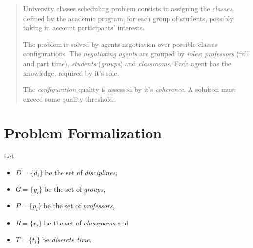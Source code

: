 \documentclass{article}
\newcommand{\red}[1]{{\color{red} #1}}
\begin{document}



\begin{abstract}
  
University classes scheduling problem consists in assigning
the \emph{classes}, defined by the academic program, for
each group of students, possibly taking in account participants' interests.

The problem is solved by agents negotiation over possible classes
configurations. The \emph{negotiating agents} are grouped by \emph{roles}:
\emph{professors} (full and part time), \emph{students} (\emph{groups}) and
\emph{classrooms}. Each agent has the knowledge, required by it's role.

The \emph{configuration} quality is assessed by it's \emph{coherence}.
A solution must exceed some quality threshold.

\end{abstract}



\def\lifetime    {\mathit{lifetime}}
\def\class       {\mathit{class}}
\def\execute     {\mathit{execute}}
\def\decide      {\mathit{decide}}
\def\knownClasses{\overset{\mathrm{known}}{\mathit{classes}}}

\section{Problem Formalization}

Let \begin{itemize}
\item[] $D=\{d_i\}$ be the set of \emph{disciplines},
\item[] $G=\{g_i\}$ be the set of \emph{groups},
\item[] $P=\{p_i\}$ be the set of \emph{professors},
\item[] $R=\{r_i\}$ be the set of \emph{classrooms} and
\item[] $T=\{t_i\}$ be \emph{discrete time}.
\end{itemize}
\end{document}
